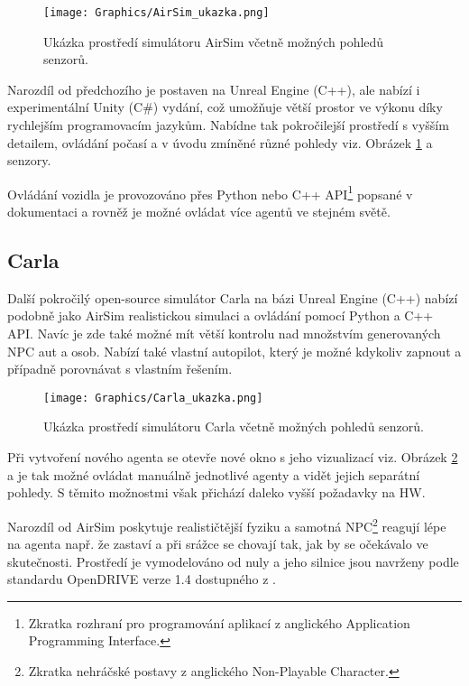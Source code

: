 \documentclass[czech, bc, kky, he, iso690numb]{fasthesis}
\begin{document}
    				\begin{figure}[h]
	    				\centering
	    				\texttt{[image: Graphics/AirSim\_ukazka.png]}
	    				\caption{Ukázka prostředí simulátoru AirSim včetně možných pohledů senzorů.}
	    				\label{pic:AirSim_ukazka}
	    			\end{figure}
    			
    			Narozdíl od předchozího je postaven na Unreal Engine (C++), ale nabízí i experimentální Unity (C\#) vydání, což umožňuje větší prostor ve výkonu díky rychlejším programovacím jazykům. Nabídne tak pokročilejší prostředí s vyšším detailem, ovládání počasí a v úvodu zmíněné různé pohledy viz. Obrázek \ref{pic:AirSim_ukazka} a senzory.
    			
    			Ovládání vozidla je provozováno přes Python nebo C++ API\footnote{Zkratka rozhraní pro programování aplikací z anglického Application Programming Interface.} popsané v dokumentaci \cite{airsim_documentation} a rovněž je možné ovládat více agentů ve stejném světě.
	    		
	    	\subsection{Carla}
	    		Další pokročilý open-source simulátor Carla na bázi Unreal Engine (C++) nabízí podobně jako AirSim realistickou simulaci a ovládání pomocí Python a C++ API. Navíc je zde také možné mít větší kontrolu nad množstvím generovaných NPC aut a osob. Nabízí také vlastní autopilot, který je možné kdykoliv zapnout a případně porovnávat s vlastním řešením.
	    		
		    		\begin{figure}[h]
		    			\centering
		    			\texttt{[image: Graphics/Carla\_ukazka.png]}
		    			\caption{Ukázka prostředí simulátoru Carla včetně možných pohledů senzorů.}
		    			\label{pic:Carla_ukazka}
		    		\end{figure}
	    		
	    		Při vytvoření nového agenta se otevře nové okno s jeho vizualizací viz. Obrázek \ref{pic:Carla_ukazka} a je tak možné ovládat manuálně jednotlivé agenty a vidět jejich separátní pohledy. S těmito možnostmi však přichází daleko vyšší požadavky na HW.
	    		
	    		Narozdíl od AirSim poskytuje realističtější fyziku a samotná NPC\footnote{Zkratka nehráčské postavy z anglického Non-Playable Character.} reagují lépe na agenta např. že zastaví a při srážce se chovají tak, jak by se očekávalo ve skutečnosti. Prostředí je vymodelováno od nuly a jeho silnice jsou navrženy podle standardu OpenDRIVE\textsuperscript{\textregistered} verze 1.4 dostupného z \cite{OpenDrive}.
	    		
\end{document}
